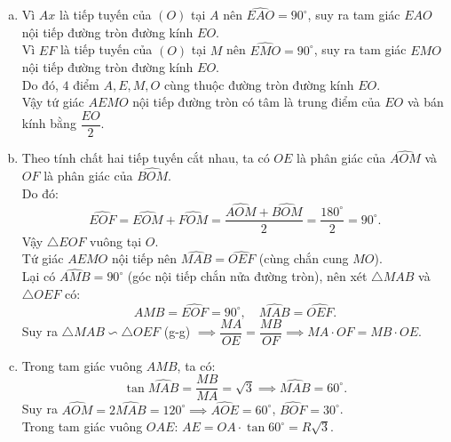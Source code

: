 \begin{bt}
{\begin{center}
\end{center}
\begin{enumerate}[a)]
    \item Vì $Ax$ là tiếp tuyến của $(O)$ tại $A$ nên $\widehat{EAO} = 90^\circ$, suy ra tam giác $EAO$ nội tiếp đường tròn đường kính $EO$.\\
    Vì $EF$ là tiếp tuyến của $(O)$ tại $M$ nên $\widehat{EMO} = 90^\circ$, suy ra tam giác $EMO$ nội tiếp đường tròn đường kính $EO$.\\
    Do đó, $4$ điểm $A, E, M, O$ cùng thuộc đường tròn đường kính $EO$.\\
    Vậy tứ giác $AEMO$ nội tiếp đường tròn có tâm là trung điểm của $EO$ và bán kính bằng $\dfrac{EO}{2}$.
    \item Theo tính chất hai tiếp tuyến cắt nhau, ta có $OE$ là phân giác của $\widehat{AOM}$ và $OF$ là phân giác của $\widehat{BOM}$.\\
    Do đó:
    $$\widehat{EOF} = \widehat{EOM} + \widehat{FOM} = \dfrac{\widehat{AOM} + \widehat{BOM}}{2} = \dfrac{180^\circ}{2} = 90^\circ.$$
    Vậy $\triangle EOF$ vuông tại $O$.\\
    Tứ giác $AEMO$ nội tiếp nên $\widehat{MAB} = \widehat{OEF}$ (cùng chắn cung $MO$).\\
    Lại có $\widehat{AMB} = 90^\circ$ (góc nội tiếp chắn nửa đường tròn), nên xét $\triangle MAB$ và $\triangle OEF$ có:
    $$\widehat{AMB} = \widehat{EOF} = 90^\circ, \quad \widehat{MAB} = \widehat{OEF}.$$
    Suy ra $\triangle MAB \backsim \triangle OEF$ (g-g) $\implies \dfrac{MA}{OE} = \dfrac{MB}{OF} \implies MA \cdot OF = MB \cdot OE$.
    \item Trong tam giác vuông $AMB$, ta có:
    $$\tan \widehat{MAB} = \dfrac{MB}{MA} = \sqrt{3} \implies \widehat{MAB} = 60^\circ.$$
    Suy ra $\widehat{AOM} = 2\widehat{MAB} = 120^\circ \implies \widehat{AOE} = 60^\circ$, $\widehat{BOF} = 30^\circ$.\\
    Trong tam giác vuông $OAE$: $AE = OA \cdot \tan 60^\circ = R\sqrt{3}$.\\

\end{enumerate}}
\end{bt}
